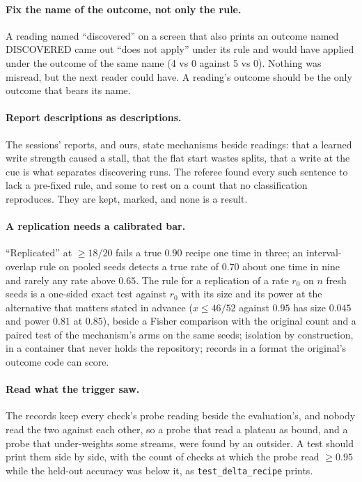 \documentclass[11pt]{article}
\begin{document}
\paragraph{Fix the name of the outcome, not only the rule.} A reading named ``discovered'' on a screen that also prints an outcome named DISCOVERED came out ``does not apply'' under its rule and would have applied under the outcome of the same name (4 vs 0 against 5 vs 0). Nothing was misread, but the next reader could have. A reading's outcome should be the only outcome that bears its name.

\paragraph{Report descriptions as descriptions.} The sessions' reports, and ours, state mechanisms beside readings: that a learned write strength caused a stall, that the flat start wastes splits, that a write at the cue is what separates discovering runs. The referee found every such sentence to lack a pre-fixed rule, and some to rest on a count that no classification reproduces. They are kept, marked, and none is a result.

\paragraph{A replication needs a calibrated bar.} ``Replicated'' at $\geq 18/20$ fails a true $0.90$ recipe one time in three; an interval-overlap rule on pooled seeds detects a true rate of $0.70$ about one time in nine and rarely any rate above $0.65$. The rule for a replication of a rate $r_0$ on $n$ fresh seeds is a one-sided exact test against $r_0$ with its size and its power at the alternative that matters stated in advance ($x \leq 46/52$ against $0.95$ has size $0.045$ and power $0.81$ at $0.85$), beside a Fisher comparison with the original count and a paired test of the mechanism's arms on the same seeds; isolation by construction, in a container that never holds the repository; records in a format the original's outcome code can score.

\paragraph{Read what the trigger saw.} The records keep every check's probe reading beside the evaluation's, and nobody read the two against each other, so a probe that read a plateau as bound, and a probe that under-weights some streams, were found by an outsider. A test should print them side by side, with the count of checks at which the probe read $\geq 0.95$ while the held-out accuracy was below it, as \texttt{test\_delta\_recipe} prints.
\end{document}
